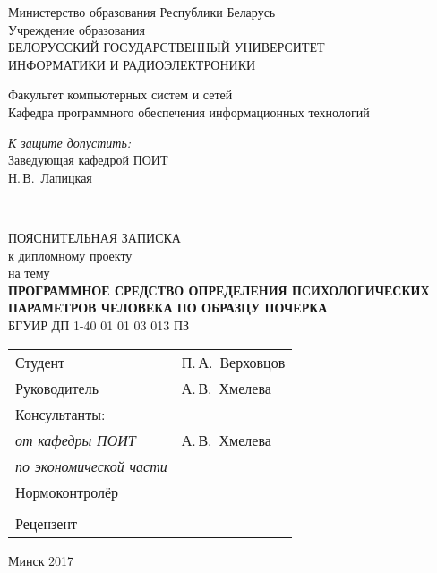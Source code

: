 \begin{titlepage}
  \begin{center}
    Министерство образования Республики Беларусь\\[1em]
    Учреждение образования\\
    БЕЛОРУССКИЙ ГОСУДАРСТВЕННЫЙ УНИВЕРСИТЕТ \\
    ИНФОРМАТИКИ И РАДИОЭЛЕКТРОНИКИ\\[1em]

    \begin{flushleft}
        Факультет компьютерных систем и сетей\\
        Кафедра программного обеспечения информационных технологий
    \end{flushleft}

    \begin{flushright}
      \begin{minipage}{0.4\textwidth}
        \textit{К защите допустить:}\\[0.8em]
        Заведующая кафедрой ПОИТ\\[0.45em]
        \underline{\hspace*{2.8cm}} Н.\,В.~Лапицкая
      \end{minipage}\\[2.2em]
    \end{flushright}

    {ПОЯСНИТЕЛЬНАЯ ЗАПИСКА}\\
    {к дипломному проекту}\\
    {на тему}\\[1em]
    \textbf{ПРОГРАММНОЕ СРЕДСТВО ОПРЕДЕЛЕНИЯ ПСИХОЛОГИЧЕСКИХ ПАРАМЕТРОВ ЧЕЛОВЕКА ПО ОБРАЗЦУ ПОЧЕРКА}\\[1em]


    {БГУИР ДП 1-40 01 01 03 013 ПЗ}\\[2em]

    \begin{tabular}{ p{}p{} }
      Студент & П.\,А.~Верховцов \\
      Руководитель & А.\,В.~Хмелева \\
      Консультанты: &\\
      \hspace*{3ex}\emph{от кафедры ПОИТ} & А.\,В.~Хмелева \\
      \hspace*{3ex}\emph{по экономической части} & \\
      Нормоконтролёр & \\
      & \\
      Рецензент &
    \end{tabular}

    \vfill
    {\normalsize Минск 2017}
  \end{center}
\end{titlepage}

